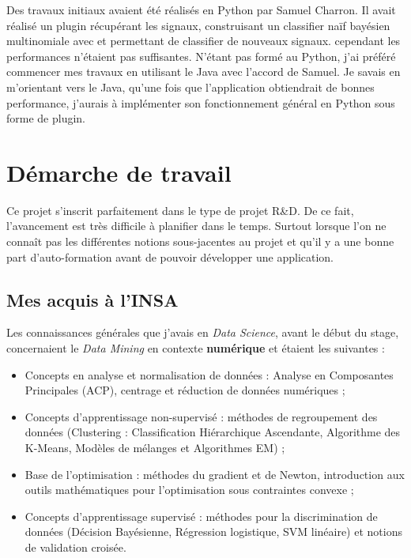 Des travaux initiaux avaient été réalisés en Python par Samuel Charron. Il avait réalisé un plugin récupérant les signaux, construisant un classifier naïf bayésien multinomiale avec et permettant de classifier de nouveaux signaux. cependant les performances n'étaient pas suffisantes. N'étant pas formé au Python, j'ai préféré commencer mes travaux en utilisant le Java avec l'accord de Samuel. Je savais en m'orientant vers le Java, qu'une fois que l'application obtiendrait de bonnes performance, j'aurais à implémenter son fonctionnement général en Python sous forme de plugin.

\section{Démarche de travail}
    Ce projet s'inscrit parfaitement dans le type de projet R\&D. De ce fait, l'avancement est très difficile à planifier dans le temps. Surtout lorsque l'on ne connaît pas les différentes notions sous-jacentes au projet et qu'il y a une bonne part d'auto-formation avant de pouvoir développer une application.

    \subsection{Mes acquis à l'INSA}
        Les connaissances générales que j'avais en \textit{Data Science}, avant le début du stage, concernaient le \textit{Data Mining} en contexte \textbf{numérique} et étaient les suivantes :
        \begin{itemize}
            \item Concepts en analyse et normalisation de données : Analyse en Composantes Principales (ACP), centrage et réduction de données numériques ;
            \item Concepts d'apprentissage non-supervisé : méthodes de regroupement des données (Clustering : Classification Hiérarchique Ascendante, Algorithme des K-Means, Modèles de mélanges et Algorithmes EM) ;
            \item Base de l'optimisation : méthodes du gradient et de Newton, introduction aux outils mathématiques pour l'optimisation sous contraintes convexe ;
            \item Concepts d'apprentissage supervisé : méthodes pour la discrimination de données (Décision Bayésienne, Régression logistique, SVM linéaire) et notions de validation croisée.\\
        \end{itemize}

